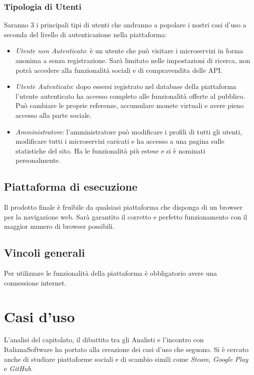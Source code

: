 \documentclass[12pt,a4paper,titlepage]{article}
\begin{document}
	\subsubsection{Tipologia di Utenti}
	Saranno 3 i principali tipi di utenti che andranno a popolare i nostri casi d'uso a seconda del livello di autenticazione nella piattaforma:
	\begin{itemize}
		\item \textit{Utente non Autenticato}: è un utente che può visitare i microservizi in forma anonima a senza registrazione. Sarà limitato nelle impostazioni di ricerca, non potrà accedere alla funzionalità sociali e di compravendita delle API.
		\item \textit{Utente Autenticato}: dopo essersi registrato nel database della piattaforma l'utente autenticato ha accesso completo alle funzionalità offerte al pubblico. Può cambiare le proprie referenze, accumulare monete virtuali e avere pieno accesso alla parte sociale. 
		\item \textit{Amministratore}: l'amministratore può modificare i profili di tutti gli utenti, modificare tutti i microservizi caricati e ha accesso a una pagina sulle statistiche del sito. Ha le funzionalità più estese e si è nominati personalmente. 
	\end{itemize}
	
	
	
	\subsection{Piattaforma di esecuzione}
	Il prodotto finale è fruibile da qualsiasi piattaforma che disponga di un browser per la navigazione web. Sarà garantito il corretto e perfetto funzionamento con il maggior numero di browser possibili. 

	\subsection{Vincoli generali}
	Per utilizzare le funzionalità della piattaforma è obbligatorio avere una connessione internet.
	\newpage
	
	\section{Casi d'uso}
	L'analisi del capitolato, il dibattito tra gli Analisti e l'incontro con ItalianaSoftware ha portato alla creazione dei casi d'uso che seguono. Si è cercato anche di studiare piattaforme sociali e di scambio simili come \textit{Steam}, \textit{Google Play} e \textit{GitHub}.
	
\end{document}
